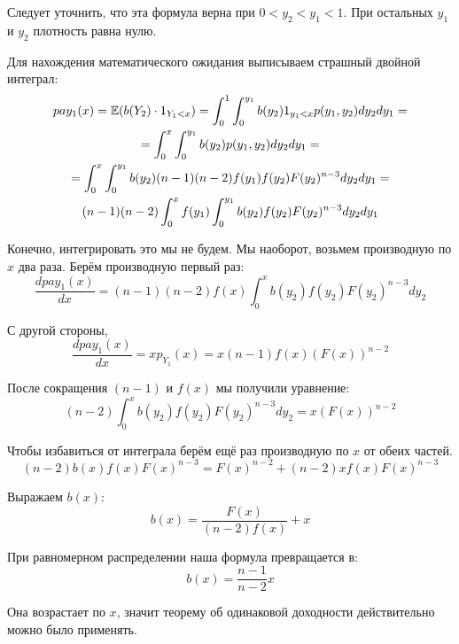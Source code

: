 \begin{myex}
Следует уточнить, что эта формула верна при $0<y_{2}<y_{1}<1$. При остальных $ y_{1} $ и $ y_{2} $ плотность равна нулю.

Для нахождения математического ожидания выписываем страшный двойной интеграл:
\begin{multline}
pay_{1}(x)=\mathbb{E}(b(Y_{2})\cdot 1_{Y_{1}<x})=\int_{0}^{1}\int_{0}^{y_{1}} b(y_{2})1_{y_{1}<x} p(y_{1},y_{2})dy_{2}dy_{1}=\\
=\int_{0}^{x}\int_{0}^{y_{1}} b(y_{2})p(y_{1},y_{2})dy_{2}dy_{1}=\\
=\int_{0}^{x}\int_{0}^{y_{1}} b(y_{2}) (n-1)(n-2)f(y_{1})f(y_{2})F(y_{2})^{n-3} dy_{2}dy_{1}=\\
(n-1)(n-2)\int_{0}^{x}f(y_{1})\int_{0}^{y_{1}} b(y_{2}) f(y_{2})F(y_{2})^{n-3} dy_{2}dy_{1}
\end{multline}

Конечно, интегрировать это мы не будем. Мы наоборот, возьмем производную по $ x $ два раза. Берём производную первый раз:
\begin{equation}
\frac{dpay_{1}(x)}{dx}=(n-1)(n-2)f(x)\int_{0}^{x} b(y_{2}) f(y_{2})F(y_{2})^{n-3} dy_{2}
\end{equation}

С другой стороны,
\begin{equation}
\frac{dpay_{1}(x)}{dx}=xp_{Y_{1}}(x)=x(n-1)f(x)(F(x))^{n-2}
\end{equation}

После сокращения $ (n-1) $ и $ f(x) $ мы получили уравнение:
\begin{equation}
(n-2)\int_{0}^{x} b(y_{2}) f(y_{2})F(y_{2})^{n-3} dy_{2}=x(F(x))^{n-2}
\end{equation}

Чтобы избавиться от интеграла берём ещё раз производную по $ x $ от обеих частей.
\begin{equation}
(n-2) b(x) f(x)F(x)^{n-3}=F(x)^{n-2}+(n-2)xf(x)F(x)^{n-3}
\end{equation}

Выражаем $ b(x) $:
\begin{equation}
b(x)=\frac{F(x)}{(n-2)f(x)}+x
\end{equation}

При равномерном распределении наша формула превращается в:
\begin{equation}
b(x)=\frac{n-1}{n-2}x
\end{equation}

Она возрастает по $ x $, значит теорему об одинаковой доходности действительно можно было применять.
\end{myex}


